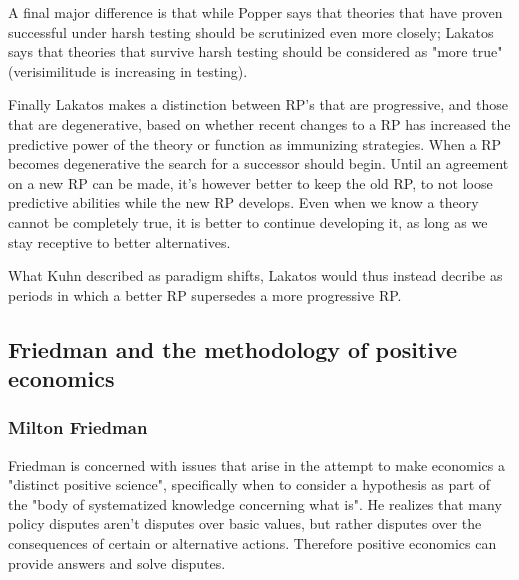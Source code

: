 \documentclass[12pt, a4paper]{article}
\begin{document}
\begin{multicols}{2}
A final major difference is that while Popper says that theories that have proven successful under harsh testing should be scrutinized even more closely; Lakatos says that theories that survive harsh testing should be considered as "more true" (verisimilitude is increasing in testing).

Finally Lakatos makes a distinction between RP's that are progressive, and those that are degenerative, based on whether recent changes to a RP has increased the predictive power of the theory or function as immunizing strategies. When a RP becomes degenerative the search for a successor should begin. Until an agreement on a new RP can be made, it's however better to keep the old RP, to not loose predictive abilities while the new RP develops. Even when we know a theory cannot be completely true, it is better to continue developing it, as long as we stay receptive to better alternatives.

What Kuhn described as paradigm shifts, Lakatos would thus instead decribe as periods in which a better RP supersedes a more progressive RP. 
\subsection{Friedman and the methodology of positive economics}
\subsubsection{Milton Friedman} 
Friedman is concerned with issues that arise in the attempt to make economics a "distinct positive science", specifically when to consider a hypothesis as part of the "body of systematized knowledge concerning what is". He realizes that many policy disputes aren't disputes over basic values, but rather disputes over the consequences of certain or alternative actions. Therefore positive economics can provide answers and solve disputes.


\end{multicols}
\end{document}
